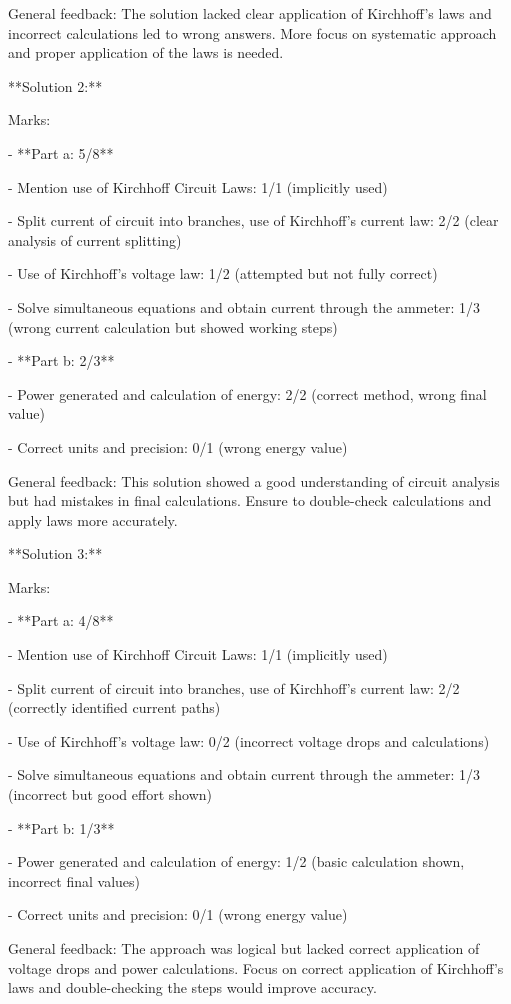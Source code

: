 \documentclass[a4paper,11pt]{article}
\begin{document}
General feedback: The solution lacked clear application of Kirchhoff's laws and incorrect calculations led to wrong answers. More focus on systematic approach and proper application of the laws is needed.

**Solution 2:**

Marks:

- **Part a: 5/8**

  - Mention use of Kirchhoff Circuit Laws: 1/1 (implicitly used)
  
  - Split current of circuit into branches, use of Kirchhoff’s current law: 2/2 (clear analysis of current splitting)
  
  - Use of Kirchhoff’s voltage law: 1/2 (attempted but not fully correct)
  
  - Solve simultaneous equations and obtain current through the ammeter: 1/3 (wrong current calculation but showed working steps)

- **Part b: 2/3**

  - Power generated and calculation of energy: 2/2 (correct method, wrong final value)
  
  - Correct units and precision: 0/1 (wrong energy value)

General feedback: This solution showed a good understanding of circuit analysis but had mistakes in final calculations. Ensure to double-check calculations and apply laws more accurately.

**Solution 3:**

Marks:

- **Part a: 4/8**

  - Mention use of Kirchhoff Circuit Laws: 1/1 (implicitly used)
  
  - Split current of circuit into branches, use of Kirchhoff’s current law: 2/2 (correctly identified current paths)
  
  - Use of Kirchhoff’s voltage law: 0/2 (incorrect voltage drops and calculations)
  
  - Solve simultaneous equations and obtain current through the ammeter: 1/3 (incorrect but good effort shown)

- **Part b: 1/3**

  - Power generated and calculation of energy: 1/2 (basic calculation shown, incorrect final values)
  
  - Correct units and precision: 0/1 (wrong energy value)

General feedback: The approach was logical but lacked correct application of voltage drops and power calculations. Focus on correct application of Kirchhoff's laws and double-checking the steps would improve accuracy.
\end{document}
